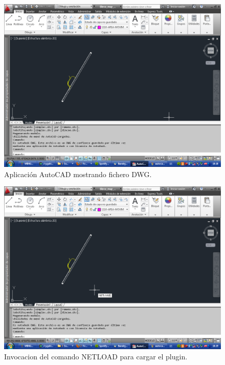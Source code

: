 \begin{figure}[h]
\begin{center}
\includegraphics[width=\textwidth]{imgs/autocad2}
\caption{Aplicación AutoCAD mostrando fichero DWG.}
\end{center}
\end{figure}

\begin{figure}[h]
\begin{center}
\includegraphics[width=\textwidth]{imgs/autocad3}
\caption{Invocacion del comando NETLOAD para cargar el plugin.}
\end{center}
\end{figure}

